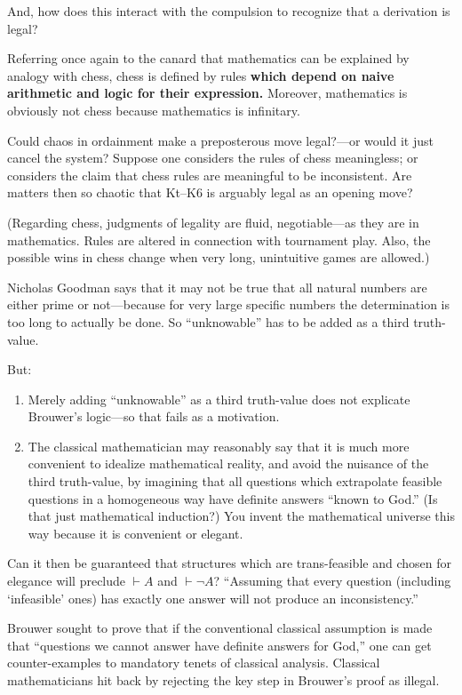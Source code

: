 And, how does this interact with the compulsion to recognize that a derivation is legal?

Referring once again to the canard that mathematics can be explained by analogy with chess, chess is defined by rules \textbf{which depend on naive arithmetic and logic for their expression.} Moreover, mathematics is obviously not chess because mathematics is infinitary.

Could chaos in ordainment make a preposterous move legal?---or would it just cancel the system? Suppose one considers the rules of chess meaningless; or considers the claim that chess rules are meaningful to be inconsistent. Are matters then so chaotic that Kt--K6 is arguably legal as an opening move?

(Regarding chess, judgments of legality are fluid, negotiable---as they are in mathematics. Rules are altered in connection with tournament play. Also, the possible wins in chess change when very long, unintuitive games are allowed.)

\jarule

Nicholas Goodman says that it may not be true that all natural numbers are either prime or not---because for very large specific numbers the determination is too long to actually be done. So \enquote{unknowable} has to be added as a third truth-value.

But:
\begin{enumerate}[label=\arabic*), itemsep=1ex]
\item Merely adding \enquote{unknowable} as a third truth-value does not explicate Brouwer's logic---so that fails as a motivation.
\item The classical mathematician may reasonably say that it is much more convenient to idealize mathematical reality, and avoid the nuisance of the third truth-value, by imagining that all questions which extrapolate feasible questions in a homogeneous way have definite answers \enquote{known to God.} (Is that just mathematical induction?) You invent the mathematical universe this way because it is convenient or elegant.
\end{enumerate}

Can it then be guaranteed that structures which are trans-feasible and chosen for elegance will preclude $\vdash A$ and $\vdash\lnot A$? \enquote{Assuming that every question (including \enquote{infeasible} ones) has exactly one answer will not produce an inconsistency.}

Brouwer sought to prove that if the conventional classical assumption is made that \enquote{questions we cannot answer have definite answers for God,} one can get counter-examples to mandatory tenets of classical analysis. Classical mathematicians hit back by rejecting the key step in Brouwer's proof as illegal.

